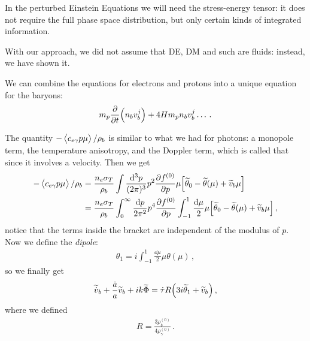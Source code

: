 \documentclass[main.tex]{subfiles}
\begin{document}

In the perturbed Einstein Equations we will need the stress-energy tensor: it does not require the full phase space distribution, but only certain kinds of integrated information. 

With our approach, we did not assume that DE, DM and such are fluids: instead, we have shown it. 

We can combine the equations for electrons and protons into a unique equation for the baryons: 
%
\begin{align}
m_p \pdv{}{t} \qty(n_b v_b^{j}) + 4H m_p n_b v_b^{j} \dots
\,.
\end{align}
%

The quantity \(- \expval{c_{e \gamma } p \mu } / \rho_{b}\) is similar to what we had for photons: a monopole term, the temperature anisotropy, and the Doppler term, which is called that since it involves a velocity. Then we get 
%
\begin{subequations}
\begin{align}
- \expval{c_{e \gamma } p \mu } / \rho_{b}
&= \frac{n_e \sigma_{T}}{\rho_{b}}
\int \frac{ \dd[3]{p}}{(2 \pi )^3} p^2 \pdv{f^{(0)}}{p} \mu \qty[ \widetilde{\theta}_{0} - \widetilde{\theta} (\mu ) + \widetilde{v}_{b} \mu ]  \\
&= \frac{n_e \sigma_{T}}{\rho_{b}}
\int_{0}^{ \infty } \frac{ \dd{p}}{2 \pi^2} p^{4} \pdv{f^{(0)}}{p} \int_{-1}^{1} \frac{ \dd{\mu }}{2} \mu \qty[\widetilde{\theta}_{0} - \widetilde{\theta} (\mu ) + \widetilde{v}_{b} \mu ] 
\,,
\end{align}
\end{subequations}
%
notice that the terms inside the bracket are independent of the modulus of \(p\). 
Now we define the \emph{dipole}: 
%
\begin{align}
\theta_{1} = i \int_{-1}^{1} \frac{ \dd{\mu }}{2 } \mu \theta(\mu )
\,,
\end{align}
%
so we finally get 
%
\begin{align}
\widetilde{\dot{v}}_{b} + \frac{\dot{a}}{a} \widetilde{v}_{b}
+ i k \widetilde{\Phi} =
\dot{\tau} R \qty(3 i \widetilde{\theta}_{1} + \widetilde{v}_{b})
\,,
\end{align}
%
where we defined 
%
\begin{align}
R = \frac{3 \rho_b^{(0)}}{4 \rho_{\gamma }^{(0)}}
\,.
\end{align}
\end{document}
